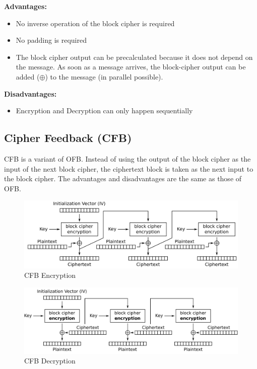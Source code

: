 \textbf{Advantages:}

\begin{itemize}
    \item No inverse operation of the block cipher is required
    \item No padding is required
    \item The block cipher output can be precalculated because it does not depend on the message. As soon as a message arrives, the block-cipher output can be added ($\oplus$) to the message (in parallel possible).
\end{itemize}

\textbf{Disadvantages:}

\begin{itemize}
    \item Encryption and Decryption can only happen sequentially
\end{itemize}

\subsection{Cipher Feedback (CFB)}\label{sec:CBF}

CFB is a variant of OFB.
Instead of using the output of the block cipher as the input of the next block cipher, the ciphertext block is taken as the next input to the block cipher.
The advantages and disadvantages are the same as those of OFB.

\begin{figure}[H]
    \center
    \includegraphics[width=\linewidth]{gfx/cfb_enc.png}
    \caption{CFB Encryption}
    \label{fig:cfb_enc}
\end{figure}

\begin{figure}[H]
    \center
    \includegraphics[width=\linewidth]{gfx/cfb_dec.png}
    \caption{CFB Decryption}
    \label{fig:cfb_dec}
\end{figure}

